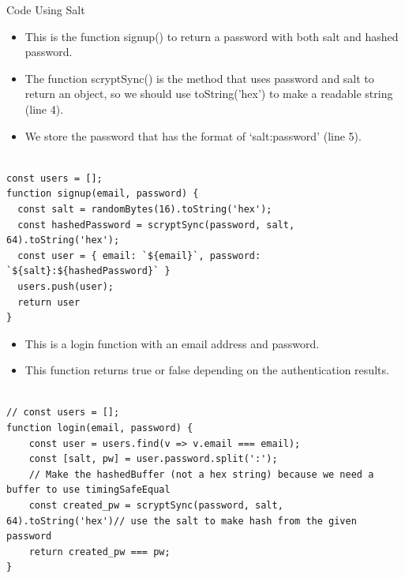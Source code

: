 \begin{frame}[fragile]{Code Using Salt}

\begin{itemize}
	\item This is the function signup() to return a password with both salt and hashed password. 
	\item The function scryptSync() is the method that uses password and salt to return an object, so we should use toString('hex') to make a readable string (line 4). 
	\item We store the password that has the format of `salt:password' (line 5). 
\end{itemize}

\begin{Code}{}%
\begin{lstlisting}[firstnumber=1, label=glabels, xleftmargin=0pt, basicstyle=\tiny]% 

const users = [];
function signup(email, password) {
  const salt = randomBytes(16).toString('hex');     
  const hashedPassword = scryptSync(password, salt, 64).toString('hex');
  const user = { email: `${email}`, password: `${salt}:${hashedPassword}` } 
  users.push(user);
  return user
}
\end{lstlisting}%
\end{Code}%
\end{frame}

\begin{frame}[fragile]{}

\begin{itemize}
	\item This is a login function with an email address and password. 
	\item This function returns true or false depending on the authentication results. 
\end{itemize}

\begin{Code}{}%
\begin{lstlisting}[firstnumber=1, label=glabels, xleftmargin=0pt, basicstyle=\scriptsize]% 

// const users = [];
function login(email, password) {
    const user = users.find(v => v.email === email);
    const [salt, pw] = user.password.split(':');
    // Make the hashedBuffer (not a hex string) because we need a buffer to use timingSafeEqual
    const created_pw = scryptSync(password, salt, 64).toString('hex')// use the salt to make hash from the given password
    return created_pw === pw; 
}
\end{lstlisting}%
\end{Code}%

\end{frame}

